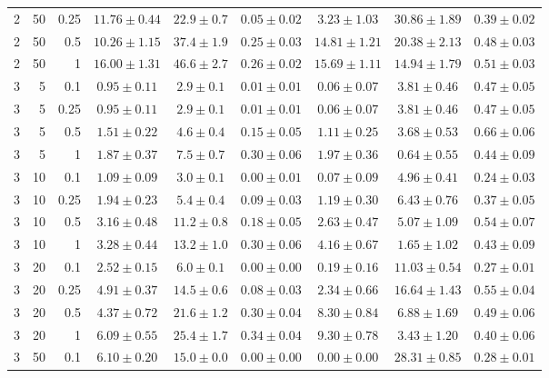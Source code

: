 \begin{table}[htbp]
\begin{tabular}{@{}rrrcccccc@{}}
2 & 50 & 0.25 & $11.76 \pm 0.44$ & $22.9 \pm 0.7$ & $0.05 \pm 0.02$ & $3.23 \pm 1.03$ & $30.86 \pm 1.89$ & $0.39 \pm 0.02$ \\
2 & 50 & 0.5 & $10.26 \pm 1.15$ & $37.4 \pm 1.9$ & $0.25 \pm 0.03$ & $14.81 \pm 1.21$ & $20.38 \pm 2.13$ & $0.48 \pm 0.03$ \\
2 & 50 & 1 & $16.00 \pm 1.31$ & $46.6 \pm 2.7$ & $0.26 \pm 0.02$ & $15.69 \pm 1.11$ & $14.94 \pm 1.79$ & $0.51 \pm 0.03$ \\
\midrule
3 & 5 & 0.1 & $0.95 \pm 0.11$ & $2.9 \pm 0.1$ & $0.01 \pm 0.01$ & $0.06 \pm 0.07$ & $3.81 \pm 0.46$ & $0.47 \pm 0.05$ \\
3 & 5 & 0.25 & $0.95 \pm 0.11$ & $2.9 \pm 0.1$ & $0.01 \pm 0.01$ & $0.06 \pm 0.07$ & $3.81 \pm 0.46$ & $0.47 \pm 0.05$ \\
3 & 5 & 0.5 & $1.51 \pm 0.22$ & $4.6 \pm 0.4$ & $0.15 \pm 0.05$ & $1.11 \pm 0.25$ & $3.68 \pm 0.53$ & $0.66 \pm 0.06$ \\
3 & 5 & 1 & $1.87 \pm 0.37$ & $7.5 \pm 0.7$ & $0.30 \pm 0.06$ & $1.97 \pm 0.36$ & $0.64 \pm 0.55$ & $0.44 \pm 0.09$ \\
3 & 10 & 0.1 & $1.09 \pm 0.09$ & $3.0 \pm 0.1$ & $0.00 \pm 0.01$ & $0.07 \pm 0.09$ & $4.96 \pm 0.41$ & $0.24 \pm 0.03$ \\
3 & 10 & 0.25 & $1.94 \pm 0.23$ & $5.4 \pm 0.4$ & $0.09 \pm 0.03$ & $1.19 \pm 0.30$ & $6.43 \pm 0.76$ & $0.37 \pm 0.05$ \\
3 & 10 & 0.5 & $3.16 \pm 0.48$ & $11.2 \pm 0.8$ & $0.18 \pm 0.05$ & $2.63 \pm 0.47$ & $5.07 \pm 1.09$ & $0.54 \pm 0.07$ \\
3 & 10 & 1 & $3.28 \pm 0.44$ & $13.2 \pm 1.0$ & $0.30 \pm 0.06$ & $4.16 \pm 0.67$ & $1.65 \pm 1.02$ & $0.43 \pm 0.09$ \\
3 & 20 & 0.1 & $2.52 \pm 0.15$ & $6.0 \pm 0.1$ & $0.00 \pm 0.00$ & $0.19 \pm 0.16$ & $11.03 \pm 0.54$ & $0.27 \pm 0.01$ \\
3 & 20 & 0.25 & $4.91 \pm 0.37$ & $14.5 \pm 0.6$ & $0.08 \pm 0.03$ & $2.34 \pm 0.66$ & $16.64 \pm 1.43$ & $0.55 \pm 0.04$ \\
3 & 20 & 0.5 & $4.37 \pm 0.72$ & $21.6 \pm 1.2$ & $0.30 \pm 0.04$ & $8.30 \pm 0.84$ & $6.88 \pm 1.69$ & $0.49 \pm 0.06$ \\
3 & 20 & 1 & $6.09 \pm 0.55$ & $25.4 \pm 1.7$ & $0.34 \pm 0.04$ & $9.30 \pm 0.78$ & $3.43 \pm 1.20$ & $0.40 \pm 0.06$ \\
3 & 50 & 0.1 & $6.10 \pm 0.20$ & $15.0 \pm 0.0$ & $0.00 \pm 0.00$ & $0.00 \pm 0.00$ & $28.31 \pm 0.85$ & $0.28 \pm 0.01$ \\

\end{tabular}
\end{table}
